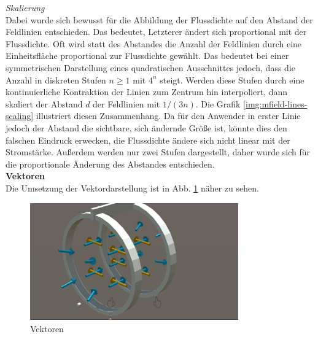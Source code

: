 \textit{Skalierung}\\
Dabei wurde sich bewusst für die Abbildung der Flussdichte auf den Abstand der Feldlinien entschieden. Das bedeutet, Letzterer ändert sich proportional mit der Flussdichte. Oft wird statt des Abstandes die Anzahl der Feldlinien durch eine Einheitsfläche proportional zur Flussdichte gewählt. Das bedeutet bei einer symmetrischen Darstellung eines quadratischen Ausschnittes jedoch, dass die Anzahl in diskreten Stufen $n \geq 1$ mit $4^{n}$ steigt. Werden diese Stufen durch eine kontinuierliche Kontraktion der Linien zum Zentrum hin interpoliert, dann skaliert der Abstand $d$ der Feldlinien mit $1/(3n)$. Die Grafik \ref{img:mfield-lines-scaling} illustriert diesen Zusammenhang. Da für den Anwender in erster Linie jedoch der Abstand die sichtbare, sich ändernde Größe ist, könnte dies den falschen Eindruck erwecken, die Flussdichte ändere sich nicht linear mit der Stromstärke. Außerdem werden nur zwei Stufen dargestellt, daher wurde sich für die proportionale Änderung des Abstandes entschieden.\\

\textbf{Vektoren}\\
Die Umsetzung der Vektordarstellung ist in Abb. \ref{img:mfield-vectors} näher zu sehen.
\begin{figure}[H]
	\centering
	\includegraphics[width=0.8\textwidth]{images/vector.jpg}
	\caption{Vektoren}
	\label{img:mfield-vectors}
\end{figure}
\vspace{4px}
\begin{center}
	\\
\end{center}
\vspace{6px}

